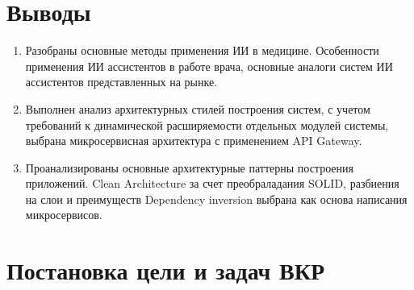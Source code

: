 











\section{Выводы}

\begin{enumerate}
    \item Разобраны основные методы применения ИИ в медицине. Особенности применения ИИ ассистентов в работе врача, основные аналоги систем ИИ ассистентов представленных на рынке.
	\item Выполнен анализ архитектурных стилей построения систем, с учетом требований к динамической расширяемости отдельных модулей системы, выбрана микросервисная архитектура с применением API Gateway.
	\item Проанализированы основные архитектурные паттерны построения приложений. Clean Architecture за счет преобраладания SOLID, разбиения на слои и преимуществ Dependency inversion выбрана как основа написания микросервисов.
\end{enumerate}

\section{Постановка цели и задач ВКР}

